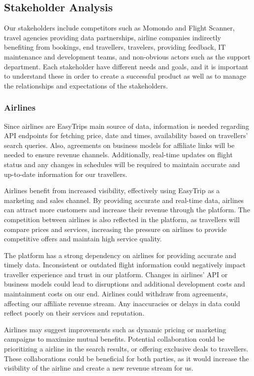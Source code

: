 \subsection{Stakeholder Analysis}
Our stakeholders include competitors such as Momondo and Flight Scanner, travel agencies providing data partnerships, airline companies indirectly benefiting from bookings, end travellers, travelers, providing feedback, IT maintenance and development teams, and non-obvious actors such as the support department. Each stakeholder have different needs and goals, and it is important to understand these in order to create a successful product as well as to manage the relationships and expectations of the stakeholders.

\subsubsection{Airlines}
Since airlines are EasyTrips main source of data, information is needed regarding API endpoints for fetching price, date and times, availability based on travellers' search queries. Also, agreements on business models for affiliate links will be needed to ensure revenue channels. Additionally, real-time updates on flight status and any changes in schedules will be required to maintain accurate and up-to-date information for our travellers.


Airlines benefit from increased visibility, effectively using EasyTrip as a marketing and sales channel. By providing accurate and real-time data, airlines can attract more customers and increase their revenue through the platform. The competition between airlines is also reflected in the platform, as travellers will compare prices and services, increasing the pressure on airlines to provide competitive offers and maintain high service quality.

   
The platform has a strong dependency on airlines for providing accurate and timely data. Inconsistent or outdated flight information could negatively impact traveller experience and trust in our platform. Changes in airlines' API or business models could lead to disruptions and additional development costs and maintainment costs on our end. Airlines could withdraw from agreements, affecting our affiliate revenue stream. Any inaccuracies or delays in data could reflect poorly on their services and reputation.


Airlines may suggest improvements such as dynamic pricing or marketing campaigns to maximize mutual benefits. Potential collaboration could be prioritizing a airline in the search results, or offering exclusive deals to travellers. These collaborations could be beneficial for both parties, as it would increase the visibility of the airline and create a new revenue stream for us.

